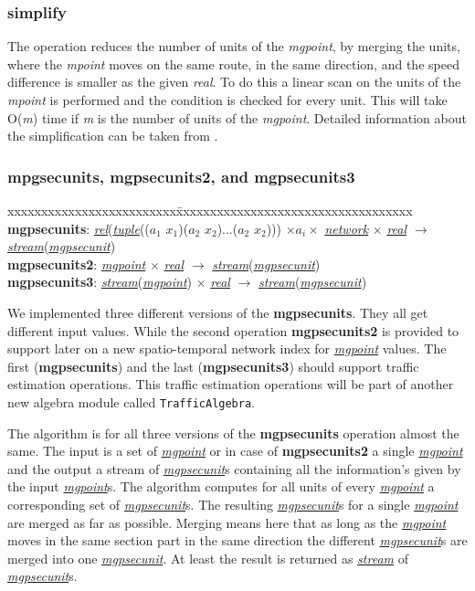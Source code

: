 \documentclass[a4paper]{article}
\newcommand{\op}[1]{\textbf{#1}}
\newcommand{\var}[1]{\textsl{#1}}
\newcommand{\dt}[1]{\textsl{\underline{#1}}}
\newcommand{\file}[1]{\texttt{#1}}
\begin{document}
\subsubsection{\op{simplify}}
The operation reduces the number of units of the \var{mgpoint}, by merging the units, where the \var{mpoint} moves on the same route, in the same direction, and the speed difference is smaller as the given \var{real}. To do this a linear scan on the units of the \var{mpoint} is performed and the condition is checked for every unit. This will take O(\var{m}) time if \var{m} is the number of units of the \var{mgpoint}. Detailed information about the simplification can be taken from \cite{DAScheppokat}. 
\subsubsection{\op{mpgsecunits}, \op{mgpsecunits2}, and \op{mgpsecunits3}}
\label{sec:opmgpsecunits}
\begin{tabbing}
xxxxxxxxxxxxxxxxxxxxxxxxx\=xxxxxxxxxxxxxxxxxxxxxxxxxxxxxxxxxxx\kill
\op{mgpsecunits}: \> \dt{rel}(\dt{tuple}(($a_1$ $x_1$)($a_2$ $x_2$)...($a_2$ $x_2$))) $\times a_i \times$ \dt{network} $\times$ \dt{real} $\rightarrow$ \dt{stream}(\dt{mgpsecunit}) \\
\op{mgpsecunits2}: \> \dt{mgpoint} $\times$ \dt{real} $\rightarrow$ \dt{stream}(\dt{mgpsecunit}) \\
\op{mgpsecunits3}: \> \dt{stream}(\dt{mgpoint}) $\times$ \dt{real} $\rightarrow$ \dt{stream}(\dt{mgpsecunit}) \\
\end{tabbing}
We implemented three different versions of the \op{mgpsecunits}. They all get different input values. While the second operation \op{mgpsecunits2} is provided to support later on a new spatio-temporal network index for \dt{mgpoint} values. The first (\op{mgpsecunits}) and the last (\op{mgpsecunits3}) should support traffic estimation operations. This traffic estimation operations will be part of another new algebra module called \file{TrafficAlgebra}.

The algorithm is for all three versions of the \op{mgpsecunits} operation almost the same. The input is a set of \dt{mgpoint} or in case of \op{mgpsecunits2} a single \dt{mgpoint} and the output a stream of \dt{mgpsecunit}s containing all the information's given by the input \dt{mgpoint}s. The algorithm computes for all units of every \dt{mgpoint} a corresponding set of \dt{mgpsecunit}s. The resulting \dt{mgpsecunit}s for a single \dt{mgpoint} are merged as far as possible. Merging means here that as long as the \dt{mgpoint} moves in the same section part in the same direction the different \dt{mgpsecunit}s are merged into one \dt{mgpsecunit}. At least the result is returned as \dt{stream} of \dt{mgpsecunit}s.
\end{document}
